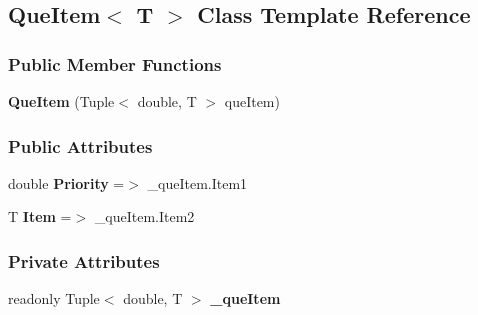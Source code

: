 \hypertarget{classDataTools_1_1utils_1_1QueItem}{}\subsection{Que\+Item$<$ T $>$ Class Template Reference}
\label{classDataTools_1_1utils_1_1QueItem}
\subsubsection*{Public Member Functions}
\begin{DoxyCompactItemize}
\item 
\mbox{\label{classDataTools_1_1utils_1_1QueItem_aec640d3f850f25436538b7b8d239dfa0}} 
{\bfseries Que\+Item} (Tuple$<$ double, T $>$ que\+Item)
\end{DoxyCompactItemize}
\subsubsection*{Public Attributes}
\begin{DoxyCompactItemize}
\item 
\mbox{\label{classDataTools_1_1utils_1_1QueItem_a1df2408757f0d8d500537d26c948fb0c}} 
double {\bfseries Priority} =$>$ \+\_\+que\+Item.\+Item1
\item 
\mbox{\label{classDataTools_1_1utils_1_1QueItem_ae76754367b2a77c2bcde5342ad346a26}} 
T {\bfseries Item} =$>$ \+\_\+que\+Item.\+Item2
\end{DoxyCompactItemize}
\subsubsection*{Private Attributes}
\begin{DoxyCompactItemize}
\item 
\mbox{\label{classDataTools_1_1utils_1_1QueItem_a4edeb4b6d65d32e739789d4d8273f808}} 
readonly Tuple$<$ double, T $>$ {\bfseries \+\_\+que\+Item}
\end{DoxyCompactItemize}
